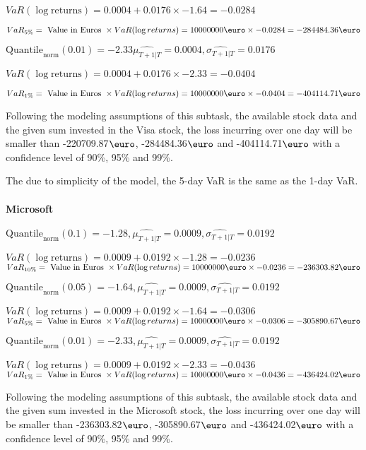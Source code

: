 $VaR(\log \text{returns}) = 0.0004 + 0.0176\times-1.64 = -0.0284$

$VaR_{5\%} = \text{ Value in Euros } \times VaR(\log returns) = 10000000 \text{\euro} \times-0.0284 = -284484.36 \text{\euro}$


$\text{Quantile}_\text{norm}(0.01) = -2.33
         \hat{\mu_{T+1|T}} = 0.0004, \hat{\sigma_{T+1|T}} = 0.0176$

$VaR(\log \text{returns}) = 0.0004 + 0.0176\times-2.33 = -0.0404$

$VaR_{1\%} = \text{ Value in Euros } \times VaR(\log returns) = 10000000 \text{\euro} \times-0.0404 = -404114.71 \text{\euro}$


Following the modeling assumptions of this subtask, the available stock data and the given sum invested in the Visa stock, the loss incurring over one day will be smaller than -220709.87$\text{\euro}$, -284484.36$\text{\euro}$  and -404114.71$\text{\euro}$  with a confidence level of 90\%, 95\%  and 99\%.

The due to simplicity of the model, the 5-day VaR is the same as the 1-day VaR.



\paragraph{Microsoft}


$\text{Quantile}_\text{norm}(0.1) = -1.28,\hat{\mu_{T+1|T}} = 0.0009, \hat{\sigma_{T+1|T}} = 0.0192$

$VaR(\log \text{returns}) = 0.0009 + 0.0192\times-1.28 = -0.0236$
$VaR_{10\%} = \text{ Value in Euros } \times VaR(\log returns) = 10 000 000 \text{\euro} \times-0.0236 = -236303.82 \text{\euro}$


$\text{Quantile}_\text{norm}(0.05) = -1.64,\hat{\mu_{T+1|T}} = 0.0009, \hat{\sigma_{T+1|T}} = 0.0192$

$VaR(\log \text{returns}) = 0.0009 + 0.0192\times-1.64 = -0.0306$
$VaR_{5\%} = \text{ Value in Euros } \times VaR(\log returns) = 10 000 000 \text{\euro} \times-0.0306 = -305890.67 \text{\euro}$


$\text{Quantile}_\text{norm}(0.01) = -2.33,\hat{\mu_{T+1|T}} = 0.0009, \hat{\sigma_{T+1|T}} = 0.0192$

$VaR(\log \text{returns}) = 0.0009 + 0.0192\times-2.33 = -0.0436$
$VaR_{1\%} = \text{ Value in Euros } \times VaR(\log returns) = 10 000 000 \text{\euro} \times-0.0436 = -436424.02 \text{\euro}$


Following the modeling assumptions of this subtask, the available stock data and the given sum invested in the Microsoft stock, the loss incurring over one day will be smaller than -236303.82$\text{\euro}$, -305890.67$\text{\euro}$  and -436424.02$\text{\euro}$  with a confidence level of 90\%, 95\%  and 99\%.

